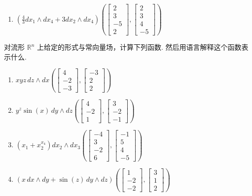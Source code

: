 \begin{question}
\begin{enumerate}
  \item[(f)] $\left(\frac{4}{3}dx_1\wedge dx_4+3dx_2\wedge dx_4\right)\left(\begin{bmatrix}2\\3\\-5\\2\end{bmatrix},\begin{bmatrix}2\\3\\4\\-5\end{bmatrix}\right)$
\end{enumerate}
\end{question}

\begin{question}\label{q:3-31}
对流形 $\mathbb{R}^n$ 上给定的形式与常向量场，计算下列函数. 然后用语言解释这个函数表示什么.
\begin{enumerate}
  \item[(a)] $xyz\,dz\wedge dx\left(\begin{bmatrix}4\\-2\\-3\end{bmatrix},\begin{bmatrix}-3\\2\\2\end{bmatrix}\right)$
  \item[(b)] $y^z\sin(x)\,dy\wedge dz\left(\begin{bmatrix}4\\-2\\1\end{bmatrix},\begin{bmatrix}3\\-2\\-1\end{bmatrix}\right)$
  \item[(c)] $\left(x_1+x_2^{x_4}\right)dx_2\wedge dx_3\left(\begin{bmatrix}-4\\3\\-2\\6\end{bmatrix},\begin{bmatrix}-1\\5\\4\\-5\end{bmatrix}\right)$
  \item[(d)] $\left(x\,dx\wedge dy+\sin(z)\,dy\wedge dz\right)\left(\begin{bmatrix}1\\-2\\-2\end{bmatrix},\begin{bmatrix}3\\1\\2\end{bmatrix}\right)$

\end{enumerate}
\end{question}
